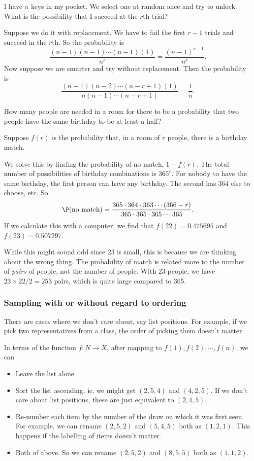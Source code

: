 \documentclass[a4paper]{article}
\begin{document}
\begin{eg}
  I have $n$ keys in my pocket. We select one at random once and try to unlock. What is the possibility that I succeed at the $r$th trial?

  Suppose we do it with replacement. We have to fail the first $r - 1$ trials and succeed in the $r$th. So the probability is
  \[
    \frac{(n - 1)(n - 1) \cdots (n - 1)(1)}{n^r} = \frac{(n - 1)^{r - 1}}{n^r}.
  \]
  Now suppose we are smarter and try without replacement. Then the probability is
  \[
    \frac{(n - 1)(n - 2)\cdots (n - r + 1)(1)}{n(n - 1) \cdots (n - r + 1)} = \frac{1}{n}.
  \]
\end{eg}
\begin{eg}
  How many people are needed in a room for there to be a probability that two people have the same birthday to be at least a half?

  Suppose $f(r)$ is the probability that, in a room of $r$ people, there is a birthday match.

  We solve this by finding the probability of no match, $1 - f(r)$. The total number of possibilities of birthday combinations is $365^r$. For nobody to have the same birthday, the first person can have any birthday. The second has 364 else to choose, etc. So
  \[
    \P(\text{no match}) = \frac{365\cdot 364\cdot 363 \cdots (366 - r)}{365\cdot 365\cdot 365 \cdots 365}.
  \]
  If we calculate this with a computer, we find that $f(22) = 0.475695$ and $f(23) = 0.507297$.

  While this might sound odd since 23 is small, this is because we are thinking about the wrong thing. The probability of match is related more to the number of \emph{pairs} of people, not the number of people. With 23 people, we have $23\times 22/2 = 253$ pairs, which is quite large compared to 365.
\end{eg}
\subsubsection*{Sampling with or without regard to ordering}
There are cases where we don't care about, say list positions. For example, if we pick two representatives from a class, the order of picking them doesn't matter.

In terms of the function $f: N\to X$, after mapping to $f(1), f(2), \cdots, f(n)$, we can
\begin{itemize}
  \item Leave the list alone
  \item Sort the list ascending. ie. we might get $(2, 5, 4)$ and $(4, 2, 5)$. If we don't care about list positions, these are just equivalent to $(2, 4, 5)$.
  \item Re-number each item by the number of the draw on which it was first seen. For example, we can rename $(2, 5, 2)$ and $(5, 4, 5)$ both as $(1, 2, 1)$. This happens if the labelling of items doesn't matter.
  \item Both of above. So we can rename $(2, 5, 2)$ and $(8, 5, 5)$ both as $(1, 1, 2)$.
\end{itemize}
\end{document}
